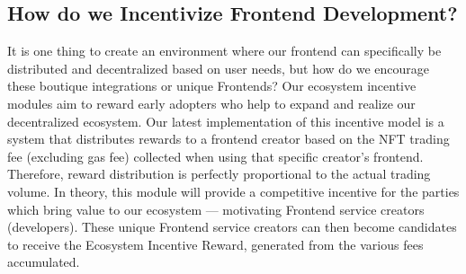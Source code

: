 \documentclass[dvipdfmx]{jsarticle}
\begin{document}
\subsection{How do we Incentivize Frontend Development?}
It is one thing to create an environment where our frontend can specifically be distributed and decentralized based on user needs, but how do we encourage these boutique integrations or unique Frontends? 
Our ecosystem incentive modules aim to reward early adopters who help to expand and realize our decentralized ecosystem.
Our latest implementation of this incentive model is a system that distributes rewards to a frontend creator based on the NFT trading fee (excluding gas fee) collected when using that specific creator’s frontend. 
Therefore, reward distribution is perfectly proportional to the actual trading volume.
In theory, this module will provide a competitive incentive for the parties which bring value to our ecosystem — motivating Frontend service creators (developers). 
These unique Frontend service creators can then become candidates to receive the Ecosystem Incentive Reward, generated from the various fees accumulated.
\end{document}
